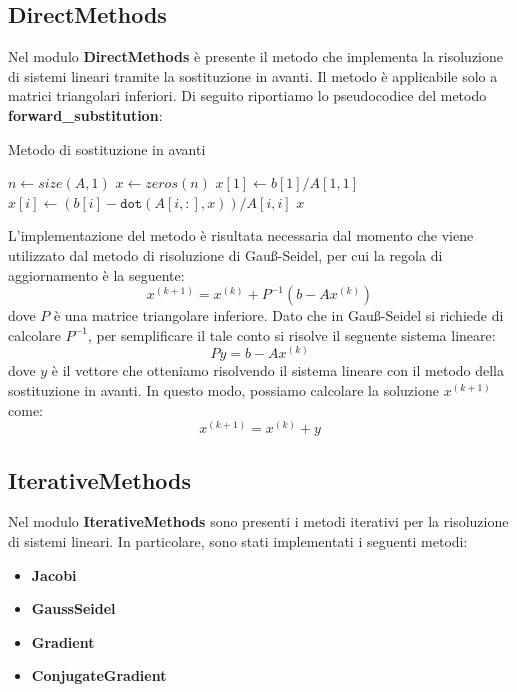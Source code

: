 \subsection{DirectMethods}
Nel modulo \textbf{DirectMethods} è presente il metodo che implementa
la risoluzione di sistemi lineari tramite la sostituzione in avanti. Il metodo
è applicabile solo a matrici triangolari inferiori. Di seguito riportiamo lo
pseudocodice del metodo \textbf{forward\_substitution}:

\begin{algorithm}
    \caption{Metodo di sostituzione in avanti}\label{alg:cap}
    \begin{algorithmic}
        \State $n \gets size(A, 1)$
        \State $x \gets zeros(n)$
        \State $x[1] \gets b[1] / A[1, 1]$
        \State $x[i] \gets (b[i] - \texttt{dot}(A[i, :], x)) / A[i, i]$
        \EndFor
        \State \Return $x$
        \EndFunction
    \end{algorithmic}
\end{algorithm}
L'implementazione del metodo è risultata necessaria dal momento che viene
utilizzato dal metodo di risoluzione di Gauß-Seidel, per cui la regola di
aggiornamento è la seguente:
\begin{equation}
    x^{(k+1)} = x^{(k)} + P^{-1}(b - Ax^{(k)})
\end{equation}
dove $P$ è una matrice triangolare inferiore. Dato che in Gauß-Seidel si richiede
di calcolare $P^{-1}$, per semplificare il tale conto si risolve il seguente sistema
lineare:
\begin{equation}
    Py = b - Ax^{(k)}
\end{equation}
dove $y$ è il vettore che otteniamo risolvendo il sistema lineare con il metodo
della sostituzione in avanti. In questo modo, possiamo calcolare la soluzione
$x^{(k+1)}$ come:
\begin{equation}
    x^{(k+1)} = x^{(k)} + y
\end{equation}
\subsection{IterativeMethods}
Nel modulo \textbf{IterativeMethods} sono presenti i metodi iterativi per la
risoluzione di sistemi lineari. In particolare, sono stati implementati i seguenti
metodi:
\begin{itemize}
    \item \textbf{Jacobi}
    \item \textbf{GaussSeidel}
    \item \textbf{Gradient}
    \item \textbf{ConjugateGradient}
\end{itemize}

